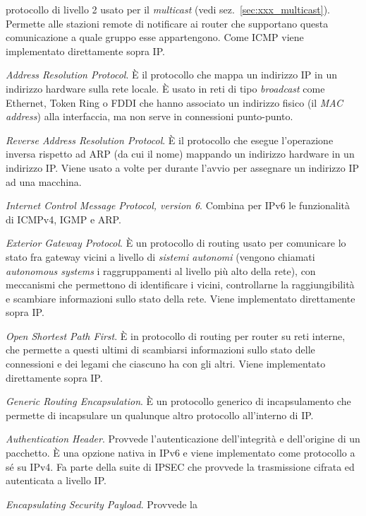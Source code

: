 \begin{basedescript}{\desclabelwidth{1.7cm}\desclabelstyle{\nextlinelabel}}
  protocollo di livello 2 usato per il \textit{multicast} (vedi
  sez.~\ref{sec:xxx_multicast}).  Permette alle stazioni remote di notificare
  ai router che supportano questa comunicazione a quale gruppo esse
  appartengono.  Come ICMP viene implementato direttamente sopra IP.
\item[\textsl{ARP}] \textit{Address Resolution Protocol}. È il protocollo che
  mappa un indirizzo IP in un indirizzo hardware sulla rete locale. È usato in
  reti di tipo \textit{broadcast} come Ethernet, Token Ring o FDDI che hanno
  associato un indirizzo fisico (il \textit{MAC address}) alla interfaccia, ma
  non serve in connessioni punto-punto.
\item[\textsl{RARP}] \textit{Reverse Address Resolution Protocol}. È il
  protocollo che esegue l'operazione inversa rispetto ad ARP (da cui il nome)
  mappando un indirizzo hardware in un indirizzo IP. Viene usato a volte per
  durante l'avvio per assegnare un indirizzo IP ad una macchina.
\item[\textsl{ICMPv6}] \textit{Internet Control Message Protocol, version 6}.
  Combina per IPv6 le funzionalità di ICMPv4, IGMP e ARP.
\item[\textsl{EGP}] \textit{Exterior Gateway Protocol}. È un protocollo di
  routing usato per comunicare lo stato fra gateway vicini a livello di
  \textsl{sistemi autonomi} (vengono chiamati \textit{autonomous
      systems} i raggruppamenti al livello più alto della rete), con
  meccanismi che permettono di identificare i vicini, controllarne la
  raggiungibilità e scambiare informazioni sullo stato della rete. Viene
  implementato direttamente sopra IP. 
\item[\textsl{OSPF}] \textit{Open Shortest Path First}. È in protocollo di
  routing per router su reti interne, che permette a questi ultimi di
  scambiarsi informazioni sullo stato delle connessioni e dei legami che
  ciascuno ha con gli altri. Viene implementato direttamente sopra IP.
\item[\textsl{GRE}] \textit{Generic Routing Encapsulation}. È un protocollo
  generico di incapsulamento che permette di incapsulare un qualunque altro
  protocollo all'interno di IP. 
\item[\textsl{AH}] \textit{Authentication Header}. Provvede l'autenticazione
  dell'integrità e dell'origine di un pacchetto. È una opzione nativa in IPv6
  e viene implementato come protocollo a sé su IPv4. Fa parte della suite di
  IPSEC che provvede la trasmissione cifrata ed autenticata a livello IP.
\item[\textsl{ESP}] \textit{Encapsulating Security Payload}. Provvede la

\end{basedescript}
